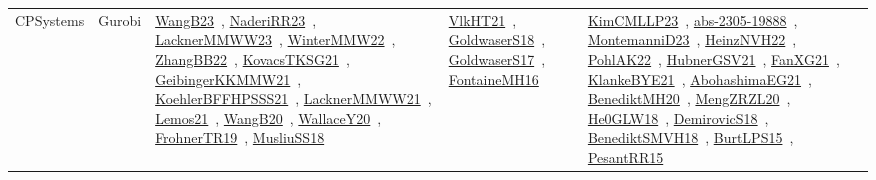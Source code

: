 {\begin{longtable}{lp{3cm}>{\raggedright\arraybackslash}p{6cm}>{\raggedright\arraybackslash}p{6cm}>{\raggedright\arraybackslash}p{8cm}}
CPSystems & Gurobi & \href{works/WangB23.pdf}{WangB23}~\cite{WangB23}, \href{works/NaderiRR23.pdf}{NaderiRR23}~\cite{NaderiRR23}, \href{works/LacknerMMWW23.pdf}{LacknerMMWW23}~\cite{LacknerMMWW23}, \href{works/WinterMMW22.pdf}{WinterMMW22}~\cite{WinterMMW22}, \href{works/ZhangBB22.pdf}{ZhangBB22}~\cite{ZhangBB22}, \href{works/KovacsTKSG21.pdf}{KovacsTKSG21}~\cite{KovacsTKSG21}, \href{works/GeibingerKKMMW21.pdf}{GeibingerKKMMW21}~\cite{GeibingerKKMMW21}, \href{works/KoehlerBFFHPSSS21.pdf}{KoehlerBFFHPSSS21}~\cite{KoehlerBFFHPSSS21}, \href{works/LacknerMMWW21.pdf}{LacknerMMWW21}~\cite{LacknerMMWW21}, \href{works/Lemos21.pdf}{Lemos21}~\cite{Lemos21}, \href{works/WangB20.pdf}{WangB20}~\cite{WangB20}, \href{works/WallaceY20.pdf}{WallaceY20}~\cite{WallaceY20}, \href{works/FrohnerTR19.pdf}{FrohnerTR19}~\cite{FrohnerTR19}, \href{works/MusliuSS18.pdf}{MusliuSS18}~\cite{MusliuSS18} & \href{works/VlkHT21.pdf}{VlkHT21}~\cite{VlkHT21}, \href{works/GoldwaserS18.pdf}{GoldwaserS18}~\cite{GoldwaserS18}, \href{works/GoldwaserS17.pdf}{GoldwaserS17}~\cite{GoldwaserS17}, \href{works/FontaineMH16.pdf}{FontaineMH16}~\cite{FontaineMH16} & \href{works/KimCMLLP23.pdf}{KimCMLLP23}~\cite{KimCMLLP23}, \href{works/abs-2305-19888.pdf}{abs-2305-19888}~\cite{abs-2305-19888}, \href{works/MontemanniD23.pdf}{MontemanniD23}~\cite{MontemanniD23}, \href{works/HeinzNVH22.pdf}{HeinzNVH22}~\cite{HeinzNVH22}, \href{works/PohlAK22.pdf}{PohlAK22}~\cite{PohlAK22}, \href{works/HubnerGSV21.pdf}{HubnerGSV21}~\cite{HubnerGSV21}, \href{works/FanXG21.pdf}{FanXG21}~\cite{FanXG21}, \href{works/KlankeBYE21.pdf}{KlankeBYE21}~\cite{KlankeBYE21}, \href{works/AbohashimaEG21.pdf}{AbohashimaEG21}~\cite{AbohashimaEG21}, \href{works/BenediktMH20.pdf}{BenediktMH20}~\cite{BenediktMH20}, \href{works/MengZRZL20.pdf}{MengZRZL20}~\cite{MengZRZL20}, \href{works/He0GLW18.pdf}{He0GLW18}~\cite{He0GLW18}, \href{works/DemirovicS18.pdf}{DemirovicS18}~\cite{DemirovicS18}, \href{works/BenediktSMVH18.pdf}{BenediktSMVH18}~\cite{BenediktSMVH18}, \href{works/BurtLPS15.pdf}{BurtLPS15}~\cite{BurtLPS15}, \href{works/PesantRR15.pdf}{PesantRR15}~\cite{PesantRR15}\\

\end{longtable}}
